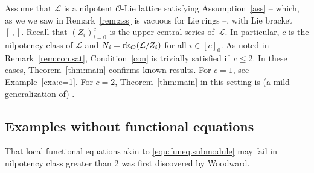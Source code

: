 \documentclass[11pt]{amsart}
\numberwithin{equation}{section}
\numberwithin{figure}{section}
\theoremstyle{plain}
\theoremstyle{definition}
\theoremstyle{remark}
\begin{document}
Assume that ${\ensuremath{\mathcal{L}}}$ is a nilpotent ${\ensuremath{\mathcal{O}}}$-Lie lattice satisfying
Assumption~\ref{ass} -- which, as we we saw in Remark~\ref{rem:ass} is
vacuous for Lie rings --, with Lie bracket~$[\,,]$. Recall that
$(Z_i)_{i=0}^c$ is the upper central series of~${\ensuremath{\mathcal{L}}}$. In particular,
$c$ is the nilpotency class of ${\ensuremath{\mathcal{L}}}$ and $N_i = {\ensuremath{{\rm rk}}}_{\ensuremath{\mathcal{O}}}({\ensuremath{\mathcal{L}}}/Z_i)$
for all $i\in[c]_0$. As noted in Remark~\ref{rem:con.sat},
Condition~\ref{con} is trivially satisfied if~$c\leq 2$. In these
cases, Theorem~\ref{thm:main} confirms known results. For $c=1$, see
Example~\ref{exa:c=1}. For $c=2$, Theorem~\ref{thm:main} in this
setting is (a mild generalization of) \cite[Theorem~C]{Voll/10}.

\subsection{Examples without functional
  equations}\label{subsec:nil.exa} That local functional equations
akin to \eqref{equ:funeq.submodule} may fail in nilpotency class
greater than $2$ was first discovered by Woodward.
\end{document}
